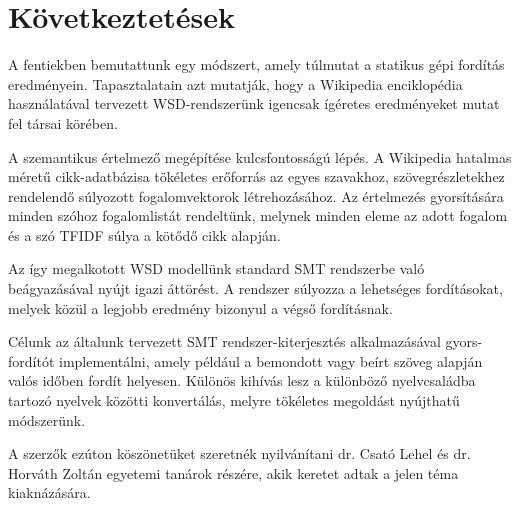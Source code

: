\section{Következtetések} \label{sec:conslusions}

A fentiekben bemutattunk egy módszert, amely túlmutat a statikus gépi fordítás eredményein. Tapasztalatain azt mutatják, hogy a Wikipedia enciklopédia használatával tervezett WSD-rendszerünk igencsak ígéretes eredményeket mutat fel társai körében.

 A szemantikus értelmező megépítése kulcsfontosságú lépés. A Wikipedia hatalmas méretű cikk-adatbázisa tökéletes erőforrás az egyes szavakhoz, szövegrészletekhez rendelendő súlyozott fogalomvektorok létrehozásához. Az értelmezés gyorsítására minden szóhoz fogalomlistát rendeltünk, melynek minden eleme az adott fogalom és a szó TFIDF súlya a kötődő cikk alapján.
 
 Az így megalkotott WSD modellünk standard SMT rendszerbe való beágyazásával nyújt igazi áttörést. A rendszer súlyozza a lehetséges fordításokat, melyek közül a legjobb eredmény bizonyul a végső fordításnak.

Célunk az általunk tervezett SMT rendszer-kiterjesztés alkalmazásával gyors-fordítót implementálni, amely például a bemondott vagy beírt szöveg alapján valós időben fordít helyesen. Különös kihívás lesz a különböző nyelvcsaládba tartozó nyelvek közötti konvertálás, melyre tökéletes megoldást nyújthatű módszerünk.

A szerzők ezúton köszönetüket szeretnék nyilvánítani dr. Csató Lehel és dr. Horváth Zoltán egyetemi tanárok részére, akik keretet adtak a jelen téma kiaknázására.